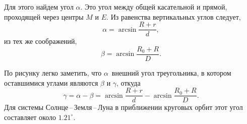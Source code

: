 \begin{figure}[h!]
    \caption{}
    \label{pic:eclipse-vertical-distance}
\end{figure}

Для этого найдем угол $\alpha$. Это угол между общей касательной и прямой, проходящей через центры $M$ и $E$. Из равенства вертикальных углов следует, 
\begin{equation}
    \alpha = \arcsin \frac{R + r}{d},
    \label{eq:eslipses-vertial-distance-alpha}
\end{equation}
из тех же соображений,
\begin{equation*}
    \beta = \arcsin \frac{R_0 + R}{D}.
\end{equation*}

По рисунку легко заметить, что $\alpha$~внешний угол треугольника, в котором оставшимися углами являются $\beta$ и $\gamma$, откуда
\begin{equation}
    \gamma = \alpha - \beta = \arcsin \frac{R + r}{d} - \arcsin \frac{R_0 + R}{D}.
\end{equation}
Для системы Солнце\,--\,Земля\,--\,Луна в приближении круговых орбит этот угол составляет около $1.21^\circ$.

